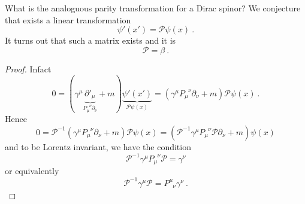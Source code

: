     What is the analoguous parity transformation for a Dirac spinor? We conjecture that exists a linear transformation 
    \begin{equation*}
        \psi' (x') = \mathcal P \psi(x) ~.
    \end{equation*}
    It turns out that such a matrix exists and it is 
    \begin{equation*}
        \mathcal P = \beta ~.
    \end{equation*}
    \begin{proof}
        Infact
        \begin{equation*}
            0 = (\gamma^\mu \underbrace{{\partial'}_\mu}_{P_\mu^{\phantom \mu \nu} \partial_\nu} + m) \underbrace{\psi'(x')}_{\mathcal P \psi(x)} = (\gamma^\mu P_\mu^{\phantom \mu \nu} \partial_\nu + m) \mathcal P \psi(x) ~.
        \end{equation*}
        Hence 
        \begin{equation*}
            0 = \mathcal P^{-1}(\gamma^\mu P_\mu^{\phantom \mu \nu} \partial_\nu + m)\mathcal P \psi(x) = (\mathcal P^{-1}\gamma^\mu P_\mu^{\phantom \mu \nu} \mathcal P \partial_\nu + m) \psi(x)
        \end{equation*}
        and to be Lorentz invariant, we have the condition 
        \begin{equation*}
            \mathcal P^{-1}\gamma^\mu P_\mu^{\phantom \mu \nu} \mathcal P = \gamma^\nu
        \end{equation*}
        or equivalently
        \begin{equation*}
            \mathcal P^{-1}\gamma^\mu \mathcal P = P^\mu_{\phantom \mu \nu} \gamma^\nu ~.
        \end{equation*}


\end{proof}
